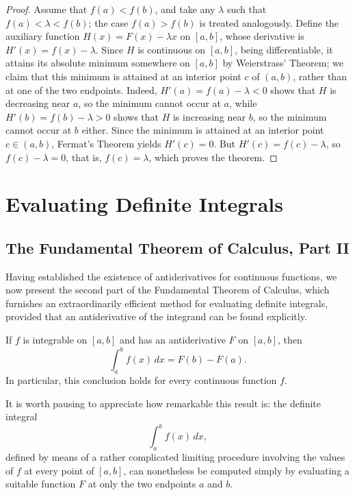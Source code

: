 \begin{proof}
Assume that $f(a) < f(b)$, and take any $\lambda$ such that $f(a) < \lambda < f(b)$; the case $f(a) > f(b)$ is treated analogously. Define the auxiliary function $H(x) = F(x) - \lambda x$ on $[a,b]$, whose derivative is $H'(x) = f(x) - \lambda$. Since $H$ is continuous on $[a,b]$, being differentiable, it attains its absolute minimum somewhere on $[a,b]$ by Weierstrass' Theorem; we claim that this minimum is attained at an interior point $c$ of $(a,b)$, rather than at one of the two endpoints. Indeed, $H'(a) = f(a) - \lambda < 0$ shows that $H$ is decreasing near $a$, so the minimum cannot occur at $a$, while $H'(b) = f(b) - \lambda > 0$ shows that $H$ is increasing near $b$, so the minimum cannot occur at $b$ either. Since the minimum is attained at an interior point $c \in (a,b)$, Fermat's Theorem yields $H'(c) = 0$. But $H'(c) = f(c) - \lambda$, so $f(c) - \lambda = 0$, that is, $f(c) = \lambda$, which proves the theorem.
\end{proof}

\section{Evaluating Definite Integrals}

\subsection{The Fundamental Theorem of Calculus, Part II}

Having established the existence of antiderivatives for continuous functions, we now present the second part of the Fundamental Theorem of Calculus, which furnishes an extraordinarily efficient method for evaluating definite integrals, provided that an antiderivative of the integrand can be found explicitly.

\begin{theorem}
If $f$ is integrable on $[a,b]$ and has an antiderivative $F$ on $[a,b]$, then
\[
\int_a^b f(x) \, dx = F(b) - F(a).
\]
In particular, this conclusion holds for every continuous function $f$.
\end{theorem}

It is worth pausing to appreciate how remarkable this result is: the definite integral \[
\int_a^b f(x) \, dx,
\] defined by means of a rather complicated limiting procedure involving the values of $f$ at every point of $[a,b]$, can nonetheless be computed simply by evaluating a suitable function $F$ at only the two endpoints $a$ and $b$.

